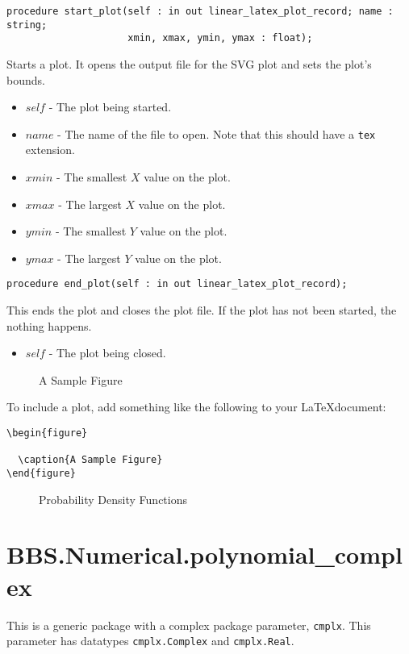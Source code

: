 \documentclass[10pt, openany]{book}
\newcommand{\datatype}[1]{\texttt{#1}}
\newcommand{\cli}[1]{\texttt{#1}}
\begin{document}
\begin{lstlisting}
procedure start_plot(self : in out linear_latex_plot_record; name : string;
                     xmin, xmax, ymin, ymax : float);
\end{lstlisting}
Starts a plot.  It opens the output file for the SVG plot and sets the plot's bounds.
\begin{itemize}
  \item $self$ - The plot being started.
  \item $name$ - The name of the file to open.  Note that this should have a \cli{tex} extension.
  \item $xmin$ - The smallest $X$ value on the plot.
  \item $xmax$ - The largest $X$ value on the plot.
  \item $ymin$ - The smallest $Y$ value on the plot.
  \item $ymax$ - The largest $Y$ value on the plot.
\end{itemize}
\begin{lstlisting}
procedure end_plot(self : in out linear_latex_plot_record);
\end{lstlisting}
This ends the plot and closes the plot file.  If the plot has not been started, the nothing happens.
\begin{itemize}
  \item $self$ - The plot being closed.
\end{itemize}

\begin{figure}
  
  \caption{A Sample Figure}
\end{figure}

To include a plot, add something like the following to your \LaTeX document:
\begin{lstlisting}
\begin{figure}
  
  \caption{A Sample Figure}
\end{figure}
\end{lstlisting}

\begin{figure}
  
  \caption{Probability Density Functions}
\end{figure}
\section{BBS.Numerical.polynomial\_complex}
This is a generic package with a complex package parameter, \datatype{cmplx}.  This parameter has datatypes \datatype{cmplx.Complex} and \datatype{cmplx.Real}.
\end{document}
